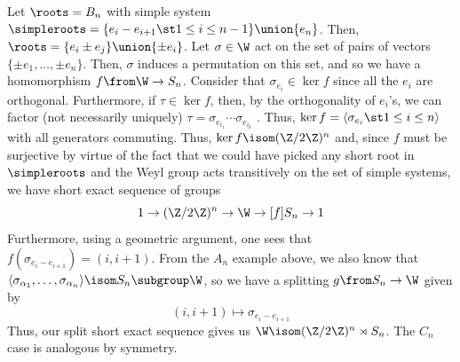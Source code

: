 \documentclass[11pt,leqno,oneside]{amsart}
\numberwithin{thm}{section}
\begin{document}
\begin{example}
  Let \(\roots = B_n\) with simple system \(\simpleroots =
  \{e_i-e_{i+1} \st 1 \leq i \leq n-1\} \union \{e_n\}\). Then, \(\roots = \{e_i \pm e_j\} \union \{\pm
  e_i\}\). Let \(\sigma \in \W\) act on the set of pairs of vectors
  \(\{\pm e_1, \ldots, \pm e_n\}\). Then, \(\sigma\) induces a
  permutation on this set, and so we have a homomorphism \(f \from \W
  \to S_n\). Consider that \(\sigma_{e_i} \in \ker f\) since all the
  \(e_i\) are orthogonal. Furthermore, if \(\tau \in \ker f\), then,
  by the orthogonality of \(e_i\)'s, we can factor (not necessarily
  uniquely) \(\tau =
  \sigma_{e_{i_1}} \cdots \sigma_{e_{i_k}}\) . Thus, \(\ker f = \langle
  \sigma_{e_i} \st 1 \leq i \leq n \rangle\) with all generators
  commuting. Thus, \(\ker f \isom (\Z/2\Z)^n\) and, since \(f\) must
  be surjective by virtue of the fact that we could have picked any
  short root in \(\simpleroots\) and the Weyl group acts transitively
  on the set of simple systems, we have short exact
  sequence of groups \[
    1 \to (\Z/2\Z)^n \to \W \to[f] S_n \to 1
  \]
  Furthermore, using a geometric argument, one sees that
  \(f(\sigma_{e_i-e_{i+1}}) = (i,i+1)\). From the \(A_n\) example
  above, we also know that \(\langle \sigma_{\alpha_1}, \ldots,
  \sigma_{\alpha_n} \rangle \isom S_n \subgroup \W\), so we have a
  splitting \(g \from S_n \to \W\) given by \[
    (i,i+1) \mapsto \sigma_{e_i-e_{i+1}}
  \]
  Thus, our split short exact sequence gives us \(\W \isom (\Z/2\Z)^n
  \rtimes S_n\). The \(C_n\) case is analogous by symmetry. 
\end{example}
\end{document}

